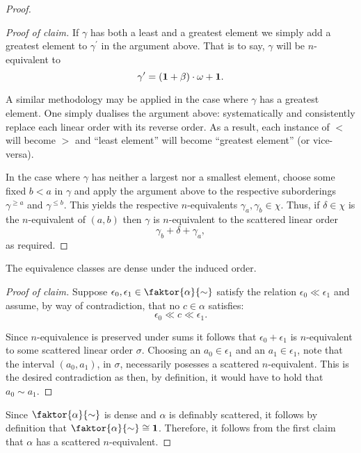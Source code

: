 \begin{proof}
\begin{proof}[Proof of claim]
		If $\gamma$ has both a least and a greatest element we simply add a
		greatest element to $\gamma^\prime$ in the argument above.  That is to
		say, $\gamma$ will be $n$-equivalent to
		\begin{equation}
			\gamma^\prime=(\mathbf{1}+\beta)\cdot\omega+\mathbf{1}.
		\end{equation}

		A similar methodology may be applied in the case where $\gamma$ has a
		greatest element. One simply dualises the argument above: systematically
		and consistently replace each linear order with its reverse order.  As a
		result, each instance of $<$ will become $>$ and ``least element'' will
		become ``greatest element'' (or vice-versa).

		In the case where $\gamma$ has neither a largest nor a smallest element,
		choose some fixed $b<a$ in $\gamma$ and apply the argument above to the
		respective suborderings $\gamma^{\geq a}$ and $\gamma^{\leq b}$.  This
		yields the respective $n$-equivalents $\gamma_a,\gamma_b\in\chi$.  Thus,
		if $\delta\in\chi$ is the $n$-equivalent of $(a,b)$ then $\gamma$ is
		$n$-equivalent to the scattered linear order
		\begin{equation}
			\gamma_b+\delta+\gamma_a,
		\end{equation}
		as required.\noqed
	\end{proof}

	\begin{claim}
		The equivalence classes are dense under the induced order.
	\end{claim}
	\begin{proof}[Proof of claim]
		Suppose $\epsilon_0,\epsilon_1\in\faktor{\alpha}{\sim}$ satisfy the
		relation $\epsilon_0\ll\epsilon_1$ and assume, by way of contradiction,
		that no $c\in\alpha$ satisfies:
		\begin{equation}
			\epsilon_0\ll c\ll\epsilon_1.
		\end{equation}

		Since $n$-equivalence is preserved under sums it follows that
		$\epsilon_0+\epsilon_1$ is $n$-equivalent to some scattered linear order
		$\sigma$.  Choosing an $a_0\in\epsilon_1$ and an $a_1\in\epsilon_1$,
		note that the interval $(a_0,a_1)$, in $\sigma$, necessarily posesses a
		scattered $n$-equivalent.  This is the desired contradiction as then, by
		definition, it would have to hold that $a_0\sim a_1$.\noqed
	\end{proof}
	Since $\faktor{\alpha}{\sim}$ is dense and $\alpha$ is definably scattered,
	it follows by definition that $\faktor{\alpha}{\sim}\cong\one$.  Therefore,
	it follows from the first claim that $\alpha$ has a scattered
	$n$-equivalent.
\end{proof}

